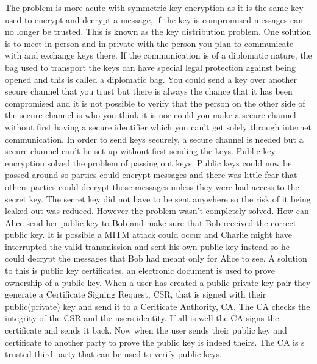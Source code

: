 The problem is more acute with symmetric key encryption as it is the same key used to encrypt and decrypt a message, if the key is compromised messages can no longer be trusted. This is known as the key distribution problem. One solution is to meet in person and in private with the person you plan to communicate with and exchange keys there. If the communication is of a diplomatic nature, the bag used to transport the keys can have special legal protection against being opened and this is called a diplomatic bag\cite{dipbag}. You could send a key over another secure channel that you trust but there is always the chance that it has been compromised and it is not possible to verify that the person on the other side of the secure channel is who you think it is nor could you make a secure channel without first having a secure identifier which you can't get solely through internet communication. In order to send keys securely, a secure channel is needed but a secure channel can't be set up without first sending the keys. Public key encryption solved the problem of passing out keys. Public keys could now be passed around so parties could encrypt messages and there was little fear that others parties could decrypt those messages unless they were had access to the secret key. The secret key did not have to be sent anywhere so the risk of it being leaked out was reduced. However the problem wasn't completely solved. How can Alice send her public key to Bob and make sure that Bob received the correct public key. It is possible a MITM attack could occur and Charlie might have interrupted the valid transmission and sent his own public key instead so he could decrypt the messages that Bob had meant only for Alice to see. A solution to this is public key certificates, an electronic document is used to prove ownership of a public key.  When a user has created a public-private key pair they generate a Certificate Signing Request, CSR, that is signed with their public(private) key and send it to a Ceriticate Authority, CA. The CA checks the integrity of the CSR and the users identity. If all is well the CA signs the certificate and sends it back. Now when the user sends their public key and certificate to another party to prove the public key is indeed theirs. The CA is s trusted third party that can be used to verify public keys.
